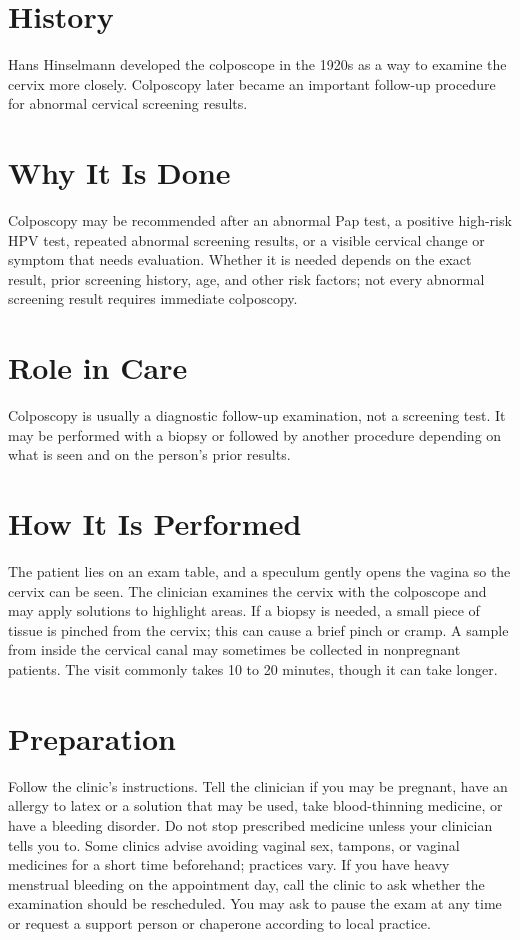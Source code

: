 \section*{History}
Hans Hinselmann developed the colposcope in the 1920s as a way to examine the cervix more closely. Colposcopy later became an important follow-up procedure for abnormal cervical screening results.

\section*{Why It Is Done}
Colposcopy may be recommended after an abnormal Pap test, a positive high-risk HPV test, repeated abnormal screening results, or a visible cervical change or symptom that needs evaluation. Whether it is needed depends on the exact result, prior screening history, age, and other risk factors; not every abnormal screening result requires immediate colposcopy.

\section*{Role in Care}
Colposcopy is usually a diagnostic follow-up examination, not a screening test. It may be performed with a biopsy or followed by another procedure depending on what is seen and on the person's prior results.

\section*{How It Is Performed}
The patient lies on an exam table, and a speculum gently opens the vagina so the cervix can be seen. The clinician examines the cervix with the colposcope and may apply solutions to highlight areas. If a biopsy is needed, a small piece of tissue is pinched from the cervix; this can cause a brief pinch or cramp. A sample from inside the cervical canal may sometimes be collected in nonpregnant patients. The visit commonly takes 10 to 20 minutes, though it can take longer.

\section*{Preparation}
Follow the clinic's instructions. Tell the clinician if you may be pregnant, have an allergy to latex or a solution that may be used, take blood-thinning medicine, or have a bleeding disorder. Do not stop prescribed medicine unless your clinician tells you to. Some clinics advise avoiding vaginal sex, tampons, or vaginal medicines for a short time beforehand; practices vary. If you have heavy menstrual bleeding on the appointment day, call the clinic to ask whether the examination should be rescheduled. You may ask to pause the exam at any time or request a support person or chaperone according to local practice.

